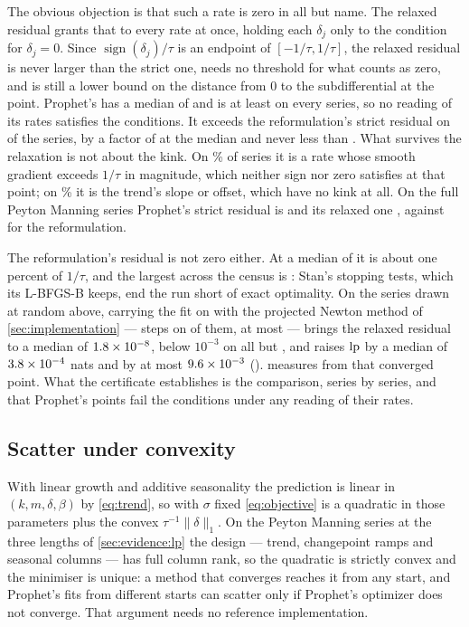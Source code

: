 The obvious objection is that such a rate is zero in all but name. The relaxed
residual grants that to every rate at once, holding each $\delta_j$ only to the
condition for $\delta_j = 0$. Since $\operatorname{sign}(\delta_j)/\tau$ is an endpoint
of $[-1/\tau, 1/\tau]$, the relaxed residual is never larger than the strict one,
needs no threshold for what counts as zero, and is still a lower bound on the distance
from $0$ to the subdifferential at the point. Prophet's has a median of
\KktProphetRelaxed{} and is at least \KktProphetRelaxedMin{} on every series, so no
reading of its rates satisfies the conditions. It exceeds the reformulation's strict
residual on \KktWorse{} of the \KktSeries{} series, by a factor of \KktRatio{} at the
median and never less than \KktRatioMin. What survives the relaxation is not about the kink. On \KktRelaxedAtRate\% of
series it is a rate whose smooth gradient exceeds $1/\tau$ in magnitude, which
neither sign nor zero satisfies at that point; on \KktRelaxedAtTrend\% it is the
trend's slope or offset, which have no kink at all. On the full Peyton Manning series
Prophet's strict residual is \KktPeytonProphetStrict{} and its relaxed one
\KktPeytonProphetRelaxed{}, against \KktPeytonOurs{} for the reformulation.

The reformulation's residual is not zero either. At a median of \KktOursMedian{} it is
about one percent of $1/\tau$, and the largest across the census is \KktOursWorst{}:
Stan's stopping tests, which its L-BFGS-B keeps, end the run short of exact
optimality. On the \KktRoundingSeries{} series drawn at random above, carrying the
fit on with the projected Newton method of \cref{sec:implementation} ---
\ConvergedSteps{} steps on \ConvergedStepsSeries{} of them, at most
\ConvergedStepsMax{} --- brings the relaxed residual to a median of
$1.8\times10^{-8}$, below $10^{-3}$ on all but \ConvergedUncertified, and
raises $\mathrm{lp}$ by a median of $3.8\times10^{-4}$ nats and by at most
$9.6\times10^{-3}$ (). 
measures from that converged point. What the certificate establishes is the
comparison, series by series, and that Prophet's points fail the conditions under
any reading of their rates.

\subsection{Scatter under convexity}
\label{sec:evidence:multistart}

With linear growth and additive seasonality the prediction is linear in
$(k, m, \delta, \beta)$ by \eqref{eq:trend}, so with $\sigma$ fixed
\eqref{eq:objective} is a quadratic in those parameters plus the convex
$\tau^{-1}\lVert\delta\rVert_1$. On the Peyton Manning series at the three lengths of
\cref{sec:evidence:lp} the design --- trend, changepoint ramps and seasonal columns ---
has full column rank, so the quadratic is strictly convex and the minimiser is
unique: a method that converges reaches it from any start, and Prophet's fits from
different starts can scatter only if Prophet's optimizer does not converge. That
argument needs no reference implementation.

